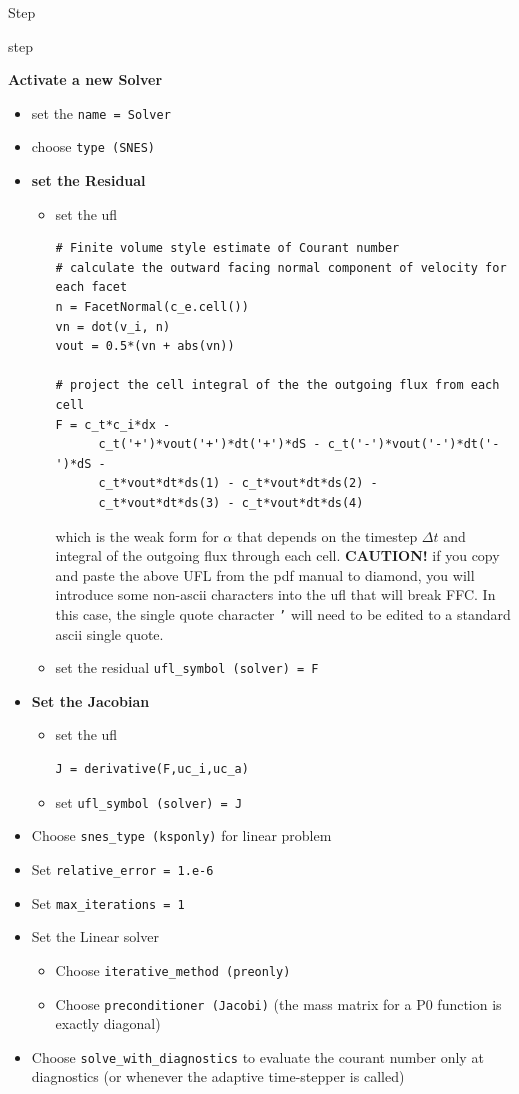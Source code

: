 \begin{steps}{Step}
\begin{steps}{step}
    \item \textbf{Activate a new Solver}
\begin{itemize}
      \item set the \texttt{name = Solver}
      \item choose \texttt{type (SNES)}
      \item \textbf{set the Residual}
        \begin{itemize}
        \item set the ufl 
\begin{lstlisting}[style=UFL]
# Finite volume style estimate of Courant number
# calculate the outward facing normal component of velocity for each facet
n = FacetNormal(c_e.cell())
vn = dot(v_i, n)
vout = 0.5*(vn + abs(vn))

# project the cell integral of the the outgoing flux from each cell
F = c_t*c_i*dx - 
      c_t('+')*vout('+')*dt('+')*dS - c_t('-')*vout('-')*dt('-')*dS - 
      c_t*vout*dt*ds(1) - c_t*vout*dt*ds(2) - 
      c_t*vout*dt*ds(3) - c_t*vout*dt*ds(4)
    \end{lstlisting}
which is the weak form for $\alpha$ that depends on the timestep
$\Delta t$ and integral of the outgoing flux through each cell. \textbf{CAUTION!}
 if you copy and paste the above UFL from the pdf manual to diamond,
 you will introduce some non-ascii characters into the ufl that will
 break FFC.  In this case,  the single quote character \texttt{'} will need to
 be edited to a standard ascii single quote.
\item set the residual \texttt{ufl\_symbol (solver) = F}
\end{itemize}
\item \textbf{Set the Jacobian}
\begin{itemize}
\item set the ufl 
\begin{lstlisting}[style=UFL]
J = derivative(F,uc_i,uc_a)
    \end{lstlisting}
\item set \texttt{ufl\_symbol (solver) = J}
        \end{itemize}
      \item Choose \texttt{snes\_type (ksponly)} for linear problem
      \item Set \texttt{relative\_error = 1.e-6}
      \item Set \texttt{max\_iterations = 1}

      \item Set the Linear solver
        \begin{itemize}
        \item Choose \texttt{iterative\_method (preonly)}
        \item Choose \texttt{preconditioner (Jacobi)} (the mass matrix
          for a P0 function is exactly diagonal)
        \end{itemize}
      \item Choose \texttt{solve\_with\_diagnostics} to evaluate the
        courant number only at diagnostics (or whenever the adaptive
        time-stepper is called)
        \end{itemize}


\end{steps}
\end{steps}
